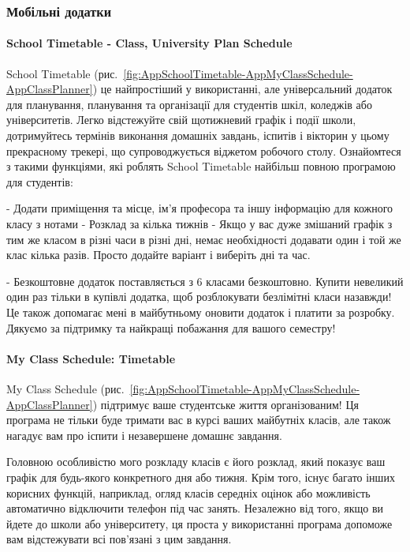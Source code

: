\subsubsection{Мобільні додатки}

\paragraph{School Timetable - Class, University Plan Schedule}


School Timetable (рис.~\ref{fig:AppSchoolTimetable-AppMyClassSchedule-AppClassPlanner}) це найпростіший у використанні, але універсальний додаток для планування, планування та організації для студентів шкіл, коледжів або університетів. Легко відстежуйте свій щотижневий графік і події школи, дотримуйтесь термінів виконання домашніх завдань, іспитів і вікторин у цьому прекрасному трекері, що супроводжується віджетом робочого столу. Ознайомтеся з такими функціями, які роблять School Timetable найбільш повною програмою для студентів:

- Додати приміщення та місце, ім'я професора та іншу інформацію для кожного класу з нотами
- Розклад за кілька тижнів
- Якщо у вас дуже змішаний графік з тим же класом в різні часи в різні дні, немає необхідності додавати один і той же клас кілька разів. Просто додайте варіант і виберіть дні та час.

- Безкоштовне додаток поставляється з 6 класами безкоштовно. Купити невеликий один раз тільки в купівлі додатка, щоб розблокувати безлімітні класи назавжди! Це також допомагає мені в майбутньому оновити додаток і платити за розробку. Дякуємо за підтримку та найкращі побажання для вашого семестру!

\paragraph{My Class Schedule: Timetable}

My Class Schedule (рис.~\ref{fig:AppSchoolTimetable-AppMyClassSchedule-AppClassPlanner}) підтримує ваше студентське життя організованим! Ця програма не тільки буде тримати вас в курсі ваших майбутніх класів, але також нагадує вам про іспити і незавершене домашнє завдання.

Головною особливістю мого розкладу класів є його розклад, який показує ваш графік для будь-якого конкретного дня або тижня. Крім того, існує багато інших корисних функцій, наприклад, огляд класів середніх оцінок або можливість автоматично відключити телефон під час занять.
Незалежно від того, якщо ви йдете до школи або університету, ця проста у використанні програма допоможе вам відстежувати всі пов'язані з цим завдання.

